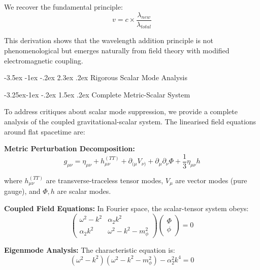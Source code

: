 \documentclass[10pt,twocolumn]{article}
\makeatletter
\renewcommand\section{\@startsection{section}{1}{\z@}%
  {-3.5ex \@plus -1ex \@minus -.2ex}%
  {2.3ex \@plus.2ex}%
  {\normalfont\large\bfseries}}
\renewcommand\subsection{\@startsection{subsection}{2}{\z@}%
  {-3.25ex\@plus -1ex \@minus -.2ex}%
  {1.5ex \@plus .2ex}%
  {\normalfont\normalsize\bfseries}}
\makeatother
\begin{document}
We recover the fundamental principle:
\begin{equation}
v = c \times \frac{\lambda_{new}}{\lambda_{total}}
\label{eq:fundamental_principle}
\end{equation}

This derivation shows that the wavelength addition principle is not phenomenological but emerges naturally from field theory with modified electromagnetic coupling.

\section{Rigorous Scalar Mode Analysis}

\subsection{Complete Metric-Scalar System}

To address critiques about scalar mode suppression, we provide a complete analysis of the coupled gravitational-scalar system. The linearised field equations around flat spacetime are:

\textbf{Metric Perturbation Decomposition:}
\begin{equation}
g_{\mu\nu} = \eta_{\mu\nu} + h_{\mu\nu}^{(TT)} + \partial_{(\mu} V_{\nu)} + \partial_\mu \partial_\nu \Phi + \frac{1}{3}\eta_{\mu\nu} h
\end{equation}

where $h_{\mu\nu}^{(TT)}$ are transverse-traceless tensor modes, $V_\mu$ are vector modes (pure gauge), and $\Phi, h$ are scalar modes.

\textbf{Coupled Field Equations:}
In Fourier space, the scalar-tensor system obeys:
\begin{equation}
\begin{pmatrix}
\omega^2 - k^2 & \alpha_2 k^2 \\
\alpha_2 k^2 & \omega^2 - k^2 - m_\phi^2
\end{pmatrix}
\begin{pmatrix}
\Phi \\ \phi
\end{pmatrix} = 0
\end{equation}

\textbf{Eigenmode Analysis:}
The characteristic equation is:
\begin{equation}
(\omega^2 - k^2)(\omega^2 - k^2 - m_\phi^2) - \alpha_2^2 k^4 = 0
\end{equation}
\end{document}
